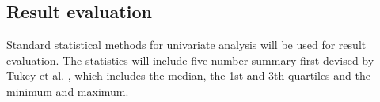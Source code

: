 \subsection{Result evaluation} \label{subsec:validation} %


Standard statistical methods for univariate analysis will be used for result evaluation. The statistics will include five-number summary first devised by Tukey et al. \cite{tukeyExploratoryDataAnalysis1977a}, which includes the median, the 1st and 3th quartiles and the minimum and maximum.






